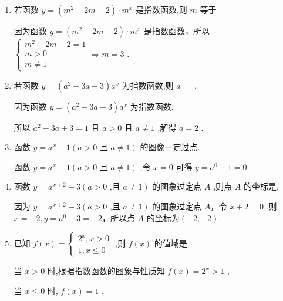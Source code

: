 \begin{enumerate}
    \item 若函数 $y = \left( {{m}^{2} - {2m} - 2}\right)  \cdot  {m}^{x}$ 是指数函数,则 $m$ 等于
    \begin{jieda}
        因为函数 $y = \left( {{m}^{2} - {2m} - 2}\right)  \cdot  {m}^{x}$ 是指数函数，所以 $\left\{  {\begin{array}{l} {m}^{2} - {2m} - 2 = 1 \\  m > 0 \\  m \neq  1 \end{array} \Longrightarrow  m = 3}\right.$ .
    \end{jieda}
    
    \item 若函数 $y = \left( {{a}^{2} - {3a} + 3}\right) {a}^{x}$ 为指数函数,则 $a =$ .
    \begin{jieda}
        因为函数 $y = \left( {{a}^{2} - {3a} + 3}\right) {a}^{x}$ 为指数函数,
        
        所以 ${a}^{2} - {3a} + 3 = 1$ 且 $a > 0$ 且 $a \neq  1$ ,解得 $a = 2$ .
    \end{jieda}
    \item 函数 $y = {a}^{x} - 1\left( {a > 0\text{ 且 }a \neq  1}\right)$ 的图像一定过点.
    \begin{jieda}
        函数 $y = {a}^{x} - 1\left( {a > 0\text{ 且 }a \neq  1}\right)$ ,令 $x = 0$ 可得 $y = {a}^{0} - 1 = 0$
    \end{jieda} 
    \item 函数 $y = {a}^{x + 2} - 3\left( {a > 0\text{ ,且 }a \neq  1}\right)$ 的图象过定点 $A$ ,则点 $A$ 的坐标是.
    \begin{jieda}
        因为 $y = {a}^{x + 2} - 3\left( {a > 0\text{ ,且 }a \neq  1}\right)$ 的图象过定点 $A$，令 $x + 2 = 0$ ,则 $x =  - 2,y = {a}^{0} - 3 =  - 2$，所以点 $A$ 的坐标为$(-2, - 2)$.
    \end{jieda}
    \item 已知 $f\left( x\right)  = \left\{  \begin{matrix} {2}^{x},x > 0 \\  1,x \leq  0 \end{matrix}\right.$ ,则 $f\left( x\right)$ 的值域是
    \begin{jieda}
        当 $x > 0$ 时,根据指数函数的图象与性质知 $f\left( x\right)  = {2}^{x} > 1$ ,
        
        当 $x \leq  0$ 时, $f\left( x\right)  = 1$ .
        

\end{jieda}
\end{enumerate}
